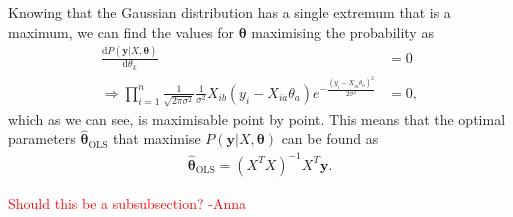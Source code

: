 \documentclass[twocolumn,english,notitlepage]{article}
\newcommand{\comment}[1]{\textcolor{red}{#1}\\}
\renewcommand{\d}[2][x]{\ensuremath{\frac{\mathrm{d}#2}{\mathrm{d}#1}}}
\renewcommand{\vec}[1]{\boldsymbol{#1}}
\newcommand{\pclosed}[1]{\left(#1\right)}
\renewcommand{\exp}[1]{e^{#1}}
\newcommand{\msub}[2]{\ensuremath{{#1}_\text{#2}}}
\begin{document}
        Knowing that the Gaussian distribution has a single extremum that is a maximum, we can find the values for $\vec{\theta}$ maximising the probability as
        \begin{align} \nonumber
            \d[\theta_k]{P(\vec{y}|X,\vec{\theta})} &= 0 \\
            \Rightarrow \prod_{i=1}^{n} \frac{1}{\sqrt{2\pi\sigma^2}} \frac{1}{\sigma^2} X_{ib}(y_i-X_{ia}\theta_a) \exp{-\frac{{(y_i - X_{ia}\theta_a)}^2}{2\sigma^2}} &= 0,
        \end{align}
        which as we can see, is maximisable point by point. This means that the optimal parameters $\msub{\vec{\hat{\theta}}}{OLS}$ that maximise $P(\vec{y}|X, \vec{\theta})$ can be found as
        \begin{align}
            \boxed{
            \msub{\vec{\hat{\theta}}}{OLS} = \pclosed{X^TX}^{-1} X^T \vec{y}.
            }
        \end{align}

    \comment{Should this be a subsubsection? -Anna}
\end{document}
